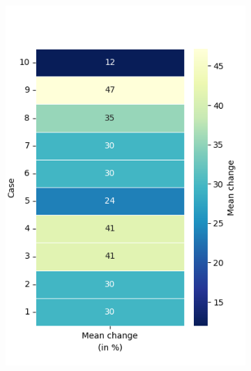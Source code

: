 \begin{figure}[h!]
	\centering
	\begin{subfigure}[t]{0.48\textwidth}
		\centering
		\includegraphics[width=\textwidth]{Figures/SP_mean_heatmap_percentage.png}
		\label{fig: SP_mean}
		\caption{}
	\end{subfigure}
	\hfill
	\begin{subfigure}[t]{0.48\textwidth}
		\centering

\end{subfigure}
\end{figure}
